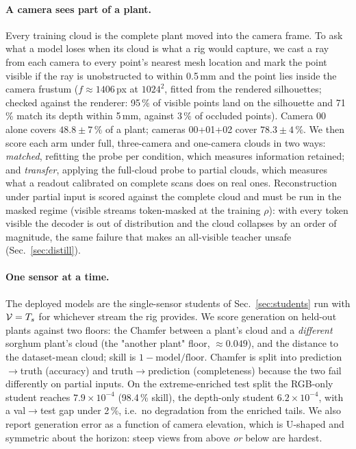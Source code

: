 \paragraph{A camera sees part of a plant.}
Every training cloud is the complete plant moved into the camera frame. To ask
what a model loses when its cloud is what a rig would capture, we cast a ray from
each camera to every point's nearest mesh location and mark the point visible if
the ray is unobstructed to within 0.5\,mm and the point lies inside the camera
frustum ($f\approx1406$\,px at $1024^2$, fitted from the rendered silhouettes;
checked against the renderer: 95\,\% of visible points land on the silhouette and
71\,\% match its depth within 5\,mm, against 3\,\% of occluded points). Camera 00
alone covers $48.8\pm7\,\%$ of a plant; cameras 00+01+02 cover $78.3\pm4\,\%$. We
then score each arm under full, three-camera and one-camera clouds in two ways:
\emph{matched}, refitting the probe per condition, which measures information
retained; and \emph{transfer}, applying the full-cloud probe to partial clouds,
which measures what a readout calibrated on complete scans does on real ones.
Reconstruction under partial input is scored against the complete cloud and must
be run in the masked regime (visible streams token-masked at the training
$\rho$): with every token visible the decoder is out of distribution and the cloud
collapses by an order of magnitude, the same failure that makes an all-visible
teacher unsafe (Sec.~\ref{sec:distill}).

\paragraph{One sensor at a time.}
The deployed models are the single-sensor students of Sec.~\ref{sec:students}
run with $\mathcal{V}=T_s$ for whichever stream the rig provides. We score generation on
held-out plants against two floors: the Chamfer between a plant's cloud and a
\emph{different} sorghum plant's cloud (the "another plant" floor, $\approx0.049$),
and the distance to the dataset-mean cloud; skill is $1-\text{model}/\text{floor}$.
Chamfer is split into prediction$\to$truth (accuracy) and truth$\to$prediction
(completeness) because the two fail differently on partial inputs. On the
extreme-enriched test split the RGB-only student reaches $7.9\times10^{-4}$
(98.4\,\% skill), the depth-only student $6.2\times10^{-4}$, with a val$\to$test gap
under 2\,\%, i.e.\ no degradation from the enriched tails. We also report
generation error as a function of camera elevation, which is U-shaped and
symmetric about the horizon: steep views from above \emph{or} below are hardest.

